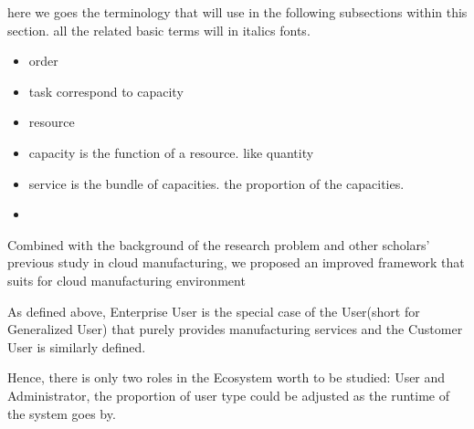 here we goes the terminology that will use in the following subsections within this section. all the related basic terms will in italics fonts.
\begin{itemize}
	\item order
	\item task correspond to capacity
	\item resource
	\item capacity is the function of a resource. like quantity
	\item service is the bundle of capacities. the proportion of the capacities.
	\item 
\end{itemize}

Combined with the background of the research problem and other scholars' previous study in cloud manufacturing, we proposed an improved framework that suits for cloud manufacturing environment



As defined above, Enterprise User is the special case of the User(short for Generalized User) that purely provides manufacturing services and the Customer User is similarly defined.

Hence, there is only two roles in the Ecosystem worth to be studied: User and Administrator, the proportion of user type could be adjusted as the runtime of the system goes by.



